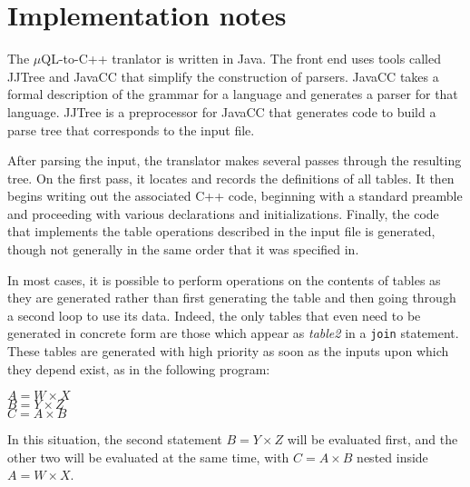\documentclass[12pt]{article}
\begin{document}
\section{Implementation notes}

The $\mu$QL-to-C++ tranlator is written in Java.  The front end uses tools
called JJTree and JavaCC that simplify the construction of parsers.  JavaCC 
takes a formal description of the grammar for a language and generates
a parser for that language.  JJTree is a preprocessor for JavaCC that 
generates code to build a parse tree that corresponds to the input file.

After parsing the input, the translator makes several passes through 
the resulting tree.  On the first pass, it locates and records the definitions 
of all tables.  It then begins writing out the associated C++ code, beginning
with a standard preamble and proceeding with various declarations and
initializations.  Finally, the code that implements the table operations 
described in the input file is generated, though not generally in the same
order that it was specified in.  

In most cases, it is possible to perform operations on the contents of 
tables as they are generated rather than first generating the table and 
then going through a second loop to use its data.  Indeed, the only tables 
that even need to be generated in concrete form are those which appear as
{\em table2} in a {\tt join} statement.  These tables are generated with
high priority as soon as the inputs upon which they depend exist, as in 
the following program:
\begin{center}
$A = W \times X$ \\
$B = Y \times Z$ \\
$C = A \times B$ \\
\end{center}
In this situation, the second statement $B = Y \times Z$ will be 
evaluated first, and the other two will be evaluated at the same time,
with $C = A \times B$ nested inside $A = W \times X$.  
\end{document}

